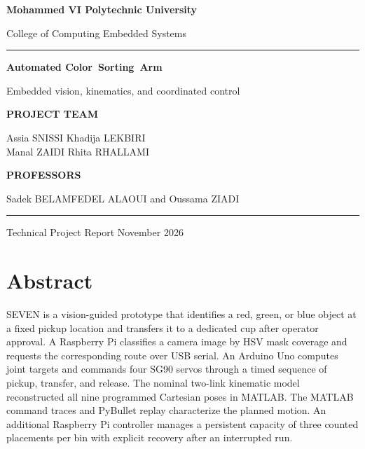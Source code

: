 \documentclass[11pt,a4paper]{article}
\newcommand{\reporttitle}{Automated Color~Sorting~Arm}
\begin{document}
\hypersetup{pageanchor=false}
\begin{titlepage}
\pagecolor{navy}\color{white}\sffamily\raggedright
\vspace*{10mm}
{\large\bfseries Mohammed VI Polytechnic University\par}
{\normalsize College of Computing \enspace\textbar\enspace Embedded Systems\par}
\vfill
{\color{teal!35!white}\rule{22mm}{2pt}\par}
\vspace{6mm}
{\fontsize{38}{42}\selectfont\bfseries \reporttitle\par}
\vspace{8mm}
{\Large Embedded vision, kinematics, and coordinated control\par}
\vfill
{\small\bfseries\color{teal!35!white} PROJECT TEAM\par}
\vspace{3mm}
{\large Assia SNISSI \quad Khadija LEKBIRI\\[2pt]
Manal ZAIDI \quad Rhita RHALLAMI\par}
\vspace{5mm}
{\small\bfseries\color{teal!35!white} PROFESSORS\par}
\vspace{3mm}
{\large Sadek BELAMFEDEL ALAOUI and Oussama ZIADI\par}
\vspace{9mm}
{\color{white!45!navy}\rule{\linewidth}{.5pt}\par}
{\small Technical Project Report \hfill November 2026\par}
\vspace*{7mm}
\end{titlepage}
\nopagecolor
\color{darktext}
\hypersetup{pageanchor=true}
\section*{Abstract}
SEVEN is a vision-guided prototype that identifies a red, green, or blue object at a fixed pickup location and transfers it to a dedicated cup after operator approval. A Raspberry Pi classifies a camera image by HSV mask coverage and requests the corresponding route over USB serial. An Arduino Uno computes joint targets and commands four SG90 servos through a timed sequence of pickup, transfer, and release. The nominal two-link kinematic model reconstructed all nine programmed Cartesian poses in MATLAB. The MATLAB command traces and PyBullet replay characterize the planned motion. An additional Raspberry Pi controller manages a persistent capacity of three counted placements per bin with explicit recovery after an interrupted run.
\end{document}
